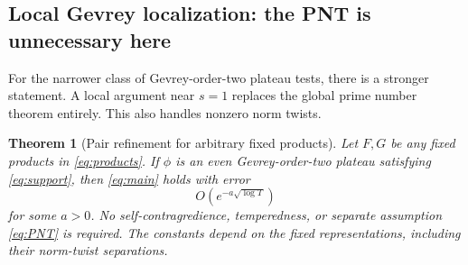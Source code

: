 \documentclass[11pt]{article}
\numberwithin{equation}{section}
\newtheorem{theorem}{Theorem}[section]
\theoremstyle{remark}
\begin{document}
\subsection{Local Gevrey localization: the PNT is unnecessary here}

For the narrower class of Gevrey-order-two plateau tests, there is a
stronger statement. A local argument near $s=1$ replaces the global
prime number theorem entirely. This also handles nonzero norm twists.

\begin{theorem}[Pair refinement for arbitrary fixed products]
\label{thm:localGevrey}
Let $F,G$ be any fixed products in \eqref{eq:products}. If $\phi$ is an
even Gevrey-order-two plateau satisfying \eqref{eq:support}, then
\eqref{eq:main} holds with error
\begin{equation}\label{eq:unconditionalpairerror}
 O\!\left(e^{-a\sqrt{\log T}}\right)
\end{equation}
for some $a>0$. No self-contragredience, temperedness, or separate
assumption \eqref{eq:PNT} is required. The constants depend on the fixed
representations, including their norm-twist separations.
\end{theorem}
\end{document}
